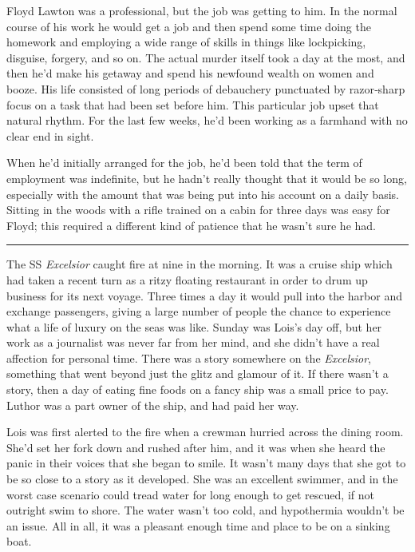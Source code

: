 Floyd Lawton was a professional, but the job was getting to him. In the
normal course of his work he would get a job and then spend some time
doing the homework and employing a wide range of skills in things like
lockpicking, disguise, forgery, and so on. The actual murder itself took
a day at the most, and then he'd make his getaway and spend his newfound
wealth on women and booze. His life consisted of long periods of
debauchery punctuated by razor‐sharp focus on a task that had been set
before him. This particular job upset that natural rhythm. For the last
few weeks, he'd been working as a farmhand with no clear end in sight.

When he'd initially arranged for the job, he'd been told that the term
of employment was indefinite, but he hadn't really thought that it would
be so long, especially with the amount that was being put into his
account on a daily basis. Sitting in the woods with a rifle trained on a
cabin for three days was easy for Floyd; this required a different kind
of patience that he wasn't sure he had.

\begin{center}\rule{0.5\linewidth}{0.5pt}\end{center}

The SS \emph{Excelsior} caught fire at nine in the morning. It was a
cruise ship which had taken a recent turn as a ritzy floating restaurant
in order to drum up business for its next voyage. Three times a day it
would pull into the harbor and exchange passengers, giving a large
number of people the chance to experience what a life of luxury on the
seas was like. Sunday was Lois's day off, but her work as a journalist
was never far from her mind, and she didn't have a real affection for
personal time. There was a story somewhere on the \emph{Excelsior},
something that went beyond just the glitz and glamour of it. If there
wasn't a story, then a day of eating fine foods on a fancy ship was a
small price to pay. Luthor was a part owner of the ship, and had paid
her way.

Lois was first alerted to the fire when a crewman hurried across the
dining room. She'd set her fork down and rushed after him, and it was
when she heard the panic in their voices that she began to smile. It
wasn't many days that she got to be so close to a story as it developed.
She was an excellent swimmer, and in the worst case scenario could tread
water for long enough to get rescued, if not outright swim to shore. The
water wasn't too cold, and hypothermia wouldn't be an issue. All in all,
it was a pleasant enough time and place to be on a sinking boat.


